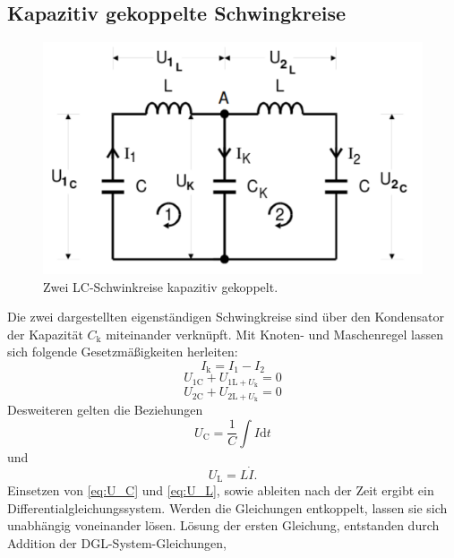 \subsection{Kapazitiv gekoppelte Schwingkreise}
\label{sec:Theorie1}
\begin{figure}[h]
	\centering
	\label{fig:gekoppelte SK}
		\includegraphics[width=\textwidth]{Bilder/2SK.pdf}
		\caption{Zwei LC-Schwinkreise kapazitiv gekoppelt.}
\end{figure}
Die zwei dargestellten eigenständigen Schwingkreise sind über den Kondensator der Kapazität $C_\mathup{k}$ miteinander verknüpft.
 Mit Knoten- und Maschenregel lassen sich folgende Gesetzmäßigkeiten herleiten:
\begin{equation}
	I_\mathup{k}=I_1-I_2
	\label{eq:I_k}
\end{equation}
\begin{equation}
	U_{1\mathup{C}}+U_{1\mathup{L}+U_{\mathup{k}}}=0
	\label{eq:U_1}
\end{equation}
\begin{equation}
	U_{2\mathup{C}}+U_{2\mathup{L}+U_{\mathup{k}}}=0
	\label{eq:U_2}
\end{equation}
Desweiteren gelten die Beziehungen
\begin{equation}
	U_\mathup{C}=\frac{1}{C}\int{I\mathup{d}t}
	\label{eq:U_C}
\end{equation}
und
\begin{equation}
	U_\mathup{L}=L\dot{I}.
	\label{eq:U_L}
\end{equation}
Einsetzen von \eqref{eq:U_C} und \eqref{eq:U_L}, sowie ableiten nach der Zeit ergibt ein Differentialgleichungssystem. 
Werden die Gleichungen entkoppelt, lassen sie sich unabhängig voneinander lösen.
Lösung der ersten Gleichung, entstanden durch Addition der DGL-System-Gleichungen,
